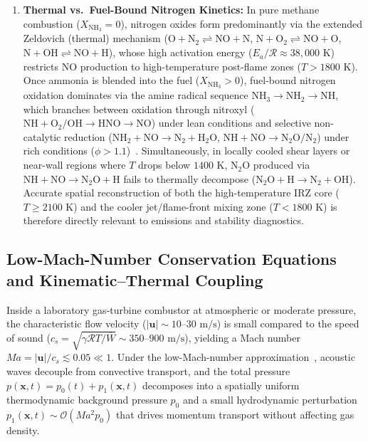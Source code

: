 \begin{enumerate}
    \item \textbf{Thermal vs.\ Fuel-Bound Nitrogen Kinetics:} In pure methane combustion ($X_{\text{NH}_3}=0$), nitrogen oxides form predominantly via the extended Zeldovich (thermal) mechanism ($\text{O} + \text{N}_2 \rightleftharpoons \text{NO} + \text{N}$, $\text{N} + \text{O}_2 \rightleftharpoons \text{NO} + \text{O}$, $\text{N} + \text{OH} \rightleftharpoons \text{NO} + \text{H}$), whose high activation energy ($E_a / \mathcal{R} \approx 38{,}000\text{ K}$) restricts $\text{NO}$ production to high-temperature post-flame zones ($T > 1800\text{ K}$). Once ammonia is blended into the fuel ($X_{\text{NH}_3} > 0$), fuel-bound nitrogen oxidation dominates via the amine radical sequence $\text{NH}_3 \rightarrow \text{NH}_2 \rightarrow \text{NH}$, which branches between oxidation through nitroxyl ($\text{NH} + \text{O}_2/\text{OH} \rightarrow \text{HNO} \rightarrow \text{NO}$) under lean conditions and selective non-catalytic reduction ($\text{NH}_2 + \text{NO} \rightarrow \text{N}_2 + \text{H}_2\text{O}$, $\text{NH} + \text{NO} \rightarrow \text{N}_2\text{O}/\text{N}_2$) under rich conditions ($\phi > 1.1$)~\cite{kobayashi2019science}. Simultaneously, in locally cooled shear layers or near-wall regions where $T$ drops below $1400\text{ K}$, $\text{N}_2\text{O}$ produced via $\text{NH} + \text{NO} \rightarrow \text{N}_2\text{O} + \text{H}$ fails to thermally decompose ($\text{N}_2\text{O} + \text{H} \rightarrow \text{N}_2 + \text{OH}$). Accurate spatial reconstruction of both the high-temperature IRZ core ($T \ge 2100\text{ K}$) and the cooler jet/flame-front mixing zone ($T < 1800\text{ K}$) is therefore directly relevant to emissions and stability diagnostics.
\end{enumerate}

\subsection{Low-Mach-Number Conservation Equations and Kinematic--Thermal Coupling}
\label{subsec:bg_lowmach}

Inside a laboratory gas-turbine combustor at atmospheric or moderate pressure, the characteristic flow velocity ($|\mathbf{u}| \sim 10\text{--}30\text{ m/s}$) is small compared to the speed of sound ($c_s = \sqrt{\gamma \mathcal{R} T / \overline{W}} \sim 350\text{--}900\text{ m/s}$), yielding a Mach number $Ma = |\mathbf{u}| / c_s \lesssim 0.05 \ll 1$. Under the low-Mach-number approximation~\cite{poinsot2005theoretical}, acoustic waves decouple from convective transport, and the total pressure $p(\mathbf{x}, t) = p_0(t) + p_1(\mathbf{x}, t)$ decomposes into a spatially uniform thermodynamic background pressure $p_0$ and a small hydrodynamic perturbation $p_1(\mathbf{x}, t) \sim \mathcal{O}(Ma^2 p_0)$ that drives momentum transport without affecting gas density.

